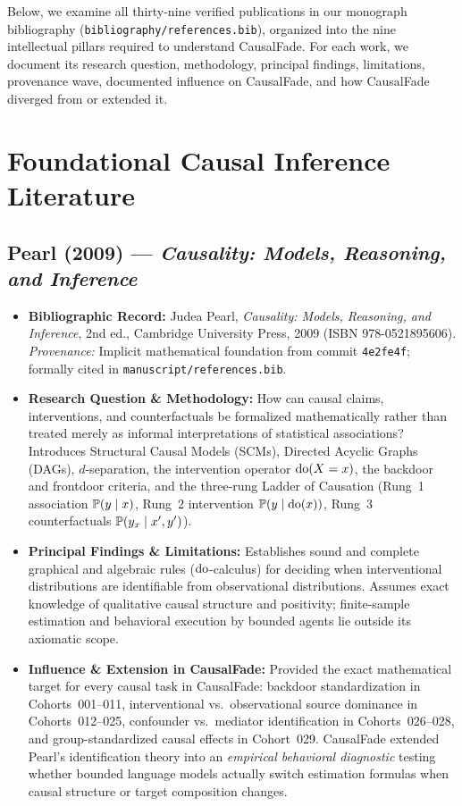 Below, we examine all thirty-nine verified publications in our monograph bibliography (\texttt{bibliography/references.bib}), organized into the nine intellectual pillars required to understand CausalFade. For each work, we document its research question, methodology, principal findings, limitations, provenance wave, documented influence on CausalFade, and how CausalFade diverged from or extended it.

\section{Foundational Causal Inference Literature}

\subsection{Pearl (2009) --- \emph{Causality: Models, Reasoning, and Inference} \citep{pearl2009causality}}
\begin{itemize}
  \item \textbf{Bibliographic Record:} Judea Pearl, \emph{Causality: Models, Reasoning, and Inference}, 2nd ed., Cambridge University Press, 2009 (ISBN 978-0521895606). \emph{Provenance:} Implicit mathematical foundation from commit \texttt{4e2fe4f}; formally cited in \texttt{manuscript/references.bib}.
  \item \textbf{Research Question \& Methodology:} How can causal claims, interventions, and counterfactuals be formalized mathematically rather than treated merely as informal interpretations of statistical associations? Introduces Structural Causal Models (SCMs), Directed Acyclic Graphs (DAGs), $d$-separation, the intervention operator $\operatorname{do}(X=x)$, the backdoor and frontdoor criteria, and the three-rung Ladder of Causation (Rung~1 association $\mathbb{P}(y\mid x)$, Rung~2 intervention $\mathbb{P}(y\mid \operatorname{do}(x))$, Rung~3 counterfactuals $\mathbb{P}(y_x\mid x', y')$).
  \item \textbf{Principal Findings \& Limitations:} Establishes sound and complete graphical and algebraic rules ($\operatorname{do}$-calculus) for deciding when interventional distributions are identifiable from observational distributions. Assumes exact knowledge of qualitative causal structure and positivity; finite-sample estimation and behavioral execution by bounded agents lie outside its axiomatic scope.
  \item \textbf{Influence \& Extension in CausalFade:} Provided the exact mathematical target for every causal task in CausalFade: backdoor standardization in Cohorts~001--011, interventional vs.\ observational source dominance in Cohorts~012--025, confounder vs.\ mediator identification in Cohorts~026--028, and group-standardized causal effects in Cohort~029. CausalFade extended Pearl's identification theory into an \emph{empirical behavioral diagnostic} testing whether bounded language models actually switch estimation formulas when causal structure or target composition changes.
\end{itemize}

